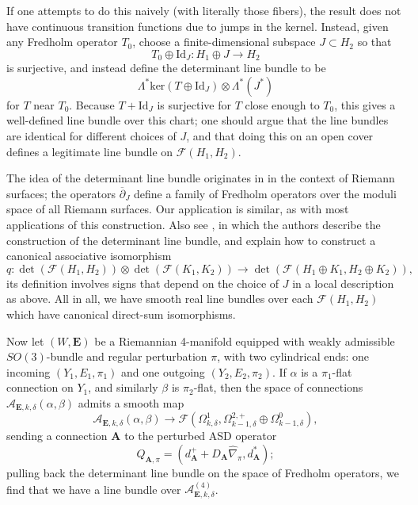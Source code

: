 \documentclass{memo-l}
\theoremstyle{definition}
\theoremstyle{remark}
\numberwithin{section}{chapter}
\numberwithin{equation}{chapter}
\begin{document}
If one attempts to do this naively (with literally those fibers), the result does not have continuous transition functions due to jumps in the kernel. Instead, given any Fredholm operator $T_0$, choose a finite-dimensional subspace $J \subset H_2$ so that 
$$T_0 \oplus \text{Id}_J: H_1 \oplus J \to H_2$$ 
is surjective, and instead define the determinant line bundle to be 
$$\Lambda^* \text{ker}(T \oplus \text{Id}_J) \otimes \Lambda^*(J^*)$$ 
for $T$ near $T_0$. Because $T + \text{Id}_J$ is surjective for $T$ close enough to $T_0$, this gives a well-defined line bundle over this chart; one should argue that the line bundles are identical for different choices of $J$, and that doing this on an open cover defines a legitimate line bundle on $\mathcal F(H_1, H_2)$.

The idea of the determinant line bundle originates in \cite{quillen} in the context of Riemann surfaces; the operators $\overline \partial_J$ define a family of Fredholm operators over the moduli space of all Riemann surfaces. Our application is similar, as with most applications of this construction. Also see \cite[Section~20.2]{KMSW}, in which the authors describe the construction of the determinant line bundle, and explain how to construct a canonical associative isomorphism $$q: \det(\mathcal F(H_1, H_2)) \otimes \det(\mathcal F(K_1, K_2)) \to \det(\mathcal F(H_1 \oplus K_1, H_2 \oplus K_2)),$$ its definition involves signs that depend on the choice of $J$ in a local description as above. All in all, we have smooth real line bundles over each $\mathcal F(H_1, H_2)$ which have canonical direct-sum isomorphisms.

Now let $(W,\mathbf{E})$ be a Riemannian 4-manifold equipped with weakly admissible $SO(3)$-bundle and regular perturbation $\pi$, with two cylindrical ends: one incoming $(Y_1, E_1,\pi_1)$ and one outgoing $(Y_2, E_2,\pi_2)$. If $\alpha$ is a $\pi_1$-flat connection on $Y_1$, and similarly $\beta$ is $\pi_2$-flat, then the space of connections $\mathcal A_{\mathbf{E}, k, \delta}(\alpha, \beta)$ admits a smooth map $$\mathcal A_{\mathbf{E}, k, \delta}(\alpha, \beta) \to \mathcal F\left(\Omega^1_{k,\delta}, \Omega^{2,+}_{k-1,\delta} \oplus \Omega^0_{k-1,\delta}\right),$$ sending a connection $\mathbf{A}$ to the perturbed ASD operator $$Q_{\mathbf{A},\pi} = (d^+_{\mathbf{A}} + D_{\mathbf{A}} \widehat{\nabla}_\pi, d^*_{\mathbf{A}});$$ pulling back the determinant line bundle on the space of Fredholm operators, we find that we have a line bundle over $\mathcal A^{(4)}_{\mathbf{E}, k, \delta}$. 
\end{document}
